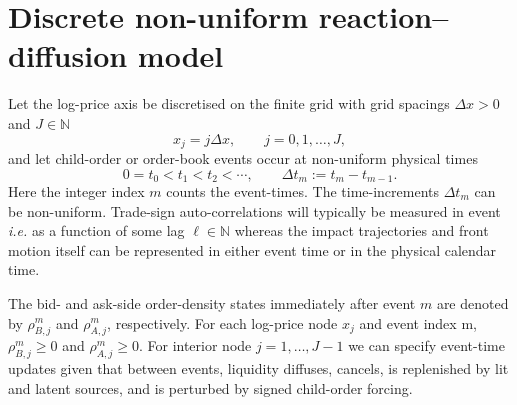 \documentclass[5p,final]{elsarticle}
\newcommand{\N}{\mathbb{N}}
\begin{document}
\section{Discrete non-uniform reaction--diffusion model}
\label{sec:model}
Let the log-price axis be discretised on the finite grid with grid spacings $\Delta x > 0$ and $J \in \N$
\begin{equation}
    x_j=j\Delta x,\qquad j=0,1,\dots,J,
\end{equation}
and let child-order or order-book events occur at non-uniform physical times
\begin{equation}
    0=t_0<t_1<t_2<\cdots,
    \qquad \Delta t_m:=t_m-t_{m-1}.
\end{equation}
Here the integer index $m$ counts the event-times. The time-increments $\Delta t_m$ can be non-uniform. Trade-sign auto-correlations will typically be measured in event {\it i.e.} as a function of some lag $\ell \in \N$ whereas the impact trajectories and front motion itself can be represented in either event time or in the physical calendar time.

The bid- and ask-side order-density states immediately after event $m$ are denoted by $\rho_{B,j}^m$ and $\rho_{A,j}^m$, respectively. For each log-price node $x_j$ and event index m, $\rho_{B,j}^m\ge 0$ and $\rho_{A,j}^m \ge 0$. For interior node $j=1,\dots,J-1$ we can specify event-time updates given that between events, liquidity diffuses, cancels, is replenished by lit and latent sources, and is perturbed by signed child-order forcing. 
\end{document}

